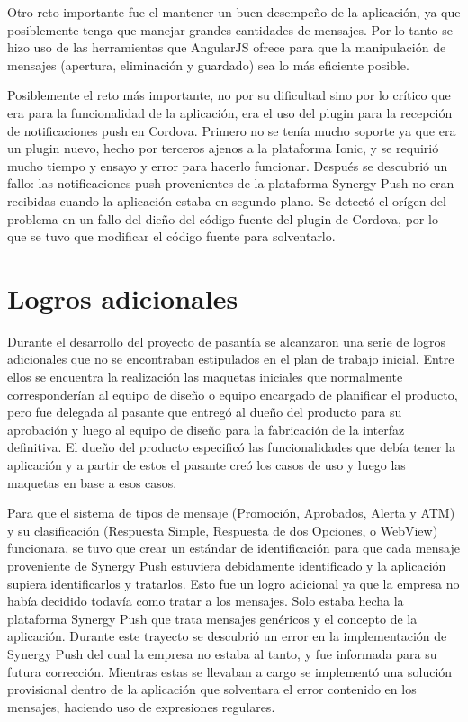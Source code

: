 Otro reto importante fue el mantener un buen desempeño de la aplicación, ya que posiblemente tenga que manejar grandes cantidades de mensajes. Por lo tanto se hizo uso de las herramientas que AngularJS ofrece para que la manipulación de mensajes (apertura, eliminación y guardado) sea lo más eficiente posible.


Posiblemente el reto más importante, no por su dificultad sino por lo crítico que era para la funcionalidad de la aplicación, era el uso del plugin para la recepción de notificaciones push en Cordova. Primero no se tenía mucho soporte ya que era un plugin nuevo, hecho por terceros ajenos a la plataforma Ionic, y se requirió mucho tiempo y ensayo y error para hacerlo funcionar. Después se descubrió un fallo: las notificaciones push provenientes de la plataforma Synergy Push no eran recibidas cuando la aplicación estaba en segundo plano. Se detectó el orígen del problema en un fallo del dieño del código fuente del plugin de Cordova, por lo que se tuvo que modificar el código fuente para solventarlo.


\section{Logros adicionales} \label{sect:Logros}
Durante el desarrollo del proyecto de pasantía se alcanzaron una serie de logros adicionales que no se encontraban estipulados en el plan de trabajo inicial. Entre ellos se encuentra la realización las maquetas iniciales que normalmente corresponderían al equipo de diseño o equipo encargado de planificar el producto, pero fue delegada al pasante que entregó al dueño del producto para su aprobación y luego al equipo de diseño para la fabricación de la interfaz definitiva. El dueño del producto especificó las funcionalidades que debía tener la aplicación y a partir de estos el pasante creó los casos de uso y luego las maquetas en base a esos casos. 

Para que el sistema de tipos de mensaje (Promoción, Aprobados, Alerta y ATM) y su clasificación (Respuesta Simple, Respuesta de dos Opciones, o WebView) funcionara, se tuvo que crear un estándar de identificación para que cada mensaje proveniente de Synergy Push estuviera debidamente identificado y la aplicación supiera identificarlos y tratarlos. Esto fue un logro adicional ya que la empresa no había decidido todavía como tratar a los mensajes. Solo estaba hecha la plataforma Synergy Push que trata mensajes genéricos y el concepto de la aplicación. Durante este trayecto se descubrió un error en la implementación de Synergy Push del cual la empresa no estaba al tanto, y fue informada para su futura corrección. Mientras estas se llevaban a cargo se implementó una solución provisional dentro de la aplicación que solventara el error contenido en los mensajes, haciendo uso de expresiones regulares.

